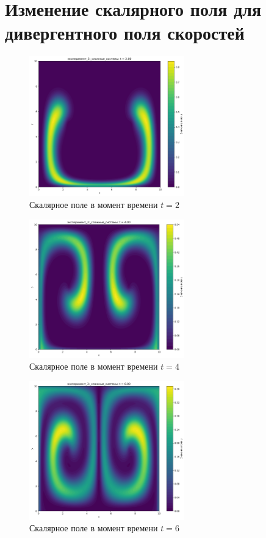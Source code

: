 \chapter{Изменение скалярного поля  для дивергентного поля скоростей}
\label{app:div_df}

\begin{figure}[h]
	\centering
	\includegraphics[width=0.6\textwidth]{imgs/эксперимент_3:_сложные_системы_t2.00.png}
	\caption{Скалярное поле в момент времени $t=2$ }
\end{figure}
\begin{figure}[h]
	\centering
	\includegraphics[width=0.6\textwidth]{imgs/эксперимент_3:_сложные_системы_t4.00.png}
	\caption{Скалярное поле в момент времени $t=4$}
\end{figure}
\begin{figure}[h]
	\centering
	\includegraphics[width=0.6\textwidth]{imgs/эксперимент_3:_сложные_системы_t6.00.png}
	\caption{Скалярное поле в момент времени $t=6$ }
\end{figure}
